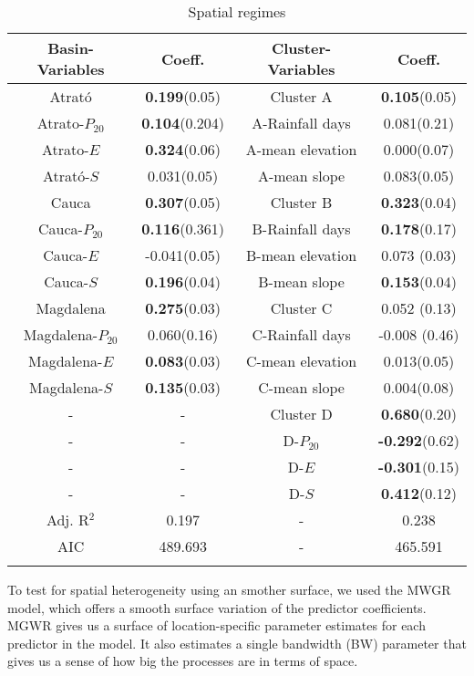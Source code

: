 \documentclass[
  manuscript=article,  
  layout=preprint,  
  year=2023,
  volume=0,
]{format}
\begin{document}
\begin{table}[htbp]\centering
\caption{Spatial regimes}
\label{tab:regimes}
\begin{tabular}{c c c c}
\toprule
\textbf{Basin-Variables} & \textbf{Coeff.} & \textbf{Cluster-Variables} & \textbf{Coeff.} \\ 
\midrule
Atrató&\textbf{0.199}(0.05)&Cluster A&\textbf{0.105}(0.05)\\
Atrato-$P_{20}$&\textbf{0.104}(0.204)&A-Rainfall days&0.081(0.21) \\
Atrato-$E$&\textbf{0.324}(0.06)&A-mean elevation&0.000(0.07)\\
Atrató-$S$&0.031(0.05)&A-mean slope&0.083(0.05)\\
Cauca&\textbf{0.307}(0.05)&Cluster B&\textbf{0.323}(0.04)\\
Cauca-$P_{20}$&\textbf{0.116}(0.361)&B-Rainfall days&\textbf{0.178}(0.17)\\
Cauca-$E$&-0.041(0.05)&B-mean elevation&0.073 (0.03)\\
Cauca-$S$&\textbf{0.196}(0.04)&B-mean slope&\textbf{0.153}(0.04)\\
Magdalena&\textbf{0.275}(0.03)&Cluster C&0.052 (0.13)\\
Magdalena-$P_{20}$&0.060(0.16)&C-Rainfall days& -0.008 (0.46)\\
Magdalena-$E$&\textbf{0.083}(0.03)&C-mean elevation&0.013(0.05)\\
Magdalena-$S$&\textbf{0.135}(0.03)&C-mean slope&0.004(0.08)\\
-&-&Cluster D&\textbf{0.680}(0.20)\\
-&-&D-$P_{20}$&\textbf{-0.292}(0.62) \\
-&-&D-$E$&\textbf{-0.301}(0.15)        \\
-&-&D-$S$&\textbf{0.412}(0.12)       \\
\midrule
Adj. R$^{2}$&0.197&-&0.238     \\
AIC&489.693&-&465.591     \\
\bottomrule
\addlinespace[1ex]
\multicolumn{3}{l}{\textbf{$p<0.05$}}
\end{tabular}
\end{table}

\par To test for spatial heterogeneity using an smother surface, we used the MWGR model, which offers a smooth surface variation of the predictor coefficients. MGWR gives us a surface of location-specific parameter estimates for each predictor in the model. It also estimates a single bandwidth (BW) parameter that gives us a sense of how big the processes are in terms of space. 
\end{document}
